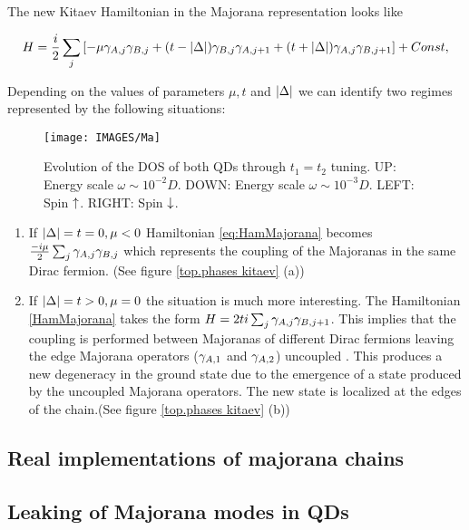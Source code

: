 The new Kitaev Hamiltonian in the Majorana representation looks like 

\begin{equation}
H = \frac{i}{2} \sum_{j} \left[ -\mu \gamma_{A,j}\gamma_{B,j}  + (t- \vert \Delta \vert) \gamma_{B,j}\gamma_{A,j+1} + (t+ \vert \Delta \vert) \gamma_{A,j}\gamma_{B,j+1} \right]+Const,\label{eq:HamMajorana}
\end{equation}

Depending on the values of parameters $\mu, t$ and $\vert \Delta \vert$ we can identify two regimes represented by the following situations:



\begin{figure}[hbt]
\centering
\texttt{[image: IMAGES/Ma]}
\caption{\label{fig:2D/Shift_t1=t2} Evolution of the DOS of both QDs through $t_1 = t_2$ tuning. UP: Energy scale $\omega \sim 10^{-2}D$. DOWN: Energy scale $\omega \sim 10^{-3}D$. LEFT: Spin $\uparrow$. RIGHT: Spin $\downarrow$.}
\end{figure}


\begin{enumerate}
\item{If $\vert \Delta \vert = t = 0, \mu <0$} Hamiltonian \eqref{eq:HamMajorana} becomes $\frac{-i\mu}{2} \sum_{j} \gamma_{A,j}\gamma_{B,j}$ which represents the coupling of the Majoranas in the same Dirac fermion. (See figure \ref{top.phases kitaev} (a))

\item{If $\vert \Delta \vert = t > 0, \mu =0$} the situation is much more interesting. The Hamiltonian \eqref{HamMajorana} takes the form $H = 2ti\sum_{j} \gamma_{A,j}\gamma_{B,j+1}$. This implies that the coupling is performed between  Majoranas of different Dirac fermions leaving the edge Majorana operators ($\gamma_{A,1}$ and $\gamma_{A,2}$) uncoupled . This produces a new degeneracy in the ground state due to the emergence of a state produced by the uncoupled Majorana operators. The new state is localized at the edges of the chain.(See figure \ref{top.phases kitaev} (b)) 
\end{enumerate}

\subsection{Real implementations of majorana chains}


\subsection{Leaking of Majorana modes in QDs}


